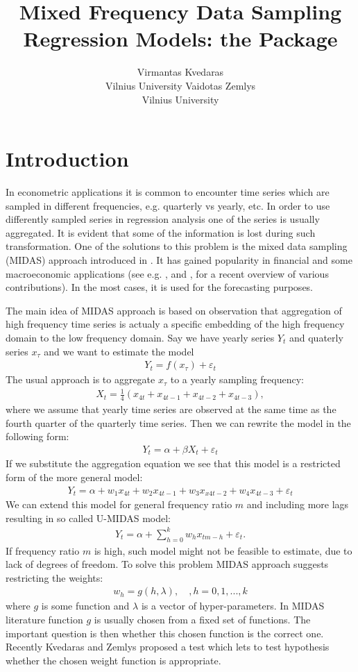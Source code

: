 \documentclass[nojss]{jss}
\author{Virmantas Kvedaras\\Vilnius University \And Vaidotas
  Zemlys\\Vilnius University}
\title{Mixed Frequency Data Sampling Regression Models: the \proglang{R}
    Package \pkg{midasr}}
\begin{document}
\section{Introduction}

In econometric applications it is common to encounter time series
which are sampled in different frequencies, e.g. quarterly vs yearly,
etc. In order to use differently sampled series in regression analysis
one of the series is usually aggregated. It is evident that some of
the information is lost during such transformation. One of the
solutions to this problem is the mixed data sampling (MIDAS) approach introduced in
\cite{ghysels_touch_2002}. It has gained popularity in financial and some
macroeconomic applications (see e.g. \citealp{foroni:2012}, and
\citealp{sinko:2012}, for a recent overview of various
contributions). In the most cases, it is used for the forecasting purposes.

The main idea of MIDAS approach is based on observation that
aggregation of high frequency time series is actualy a specific
embedding of the high frequency domain to the low frequency
domain. Say we have yearly series $Y_t$ and quaterly series
$x_{\tau}$ and we want to estimate the model
\begin{align*}
  Y_{t}=f(x_{\tau})+\varepsilon_t
\end{align*}
The usual approach is to aggregate $x_{\tau}$ to a yearly sampling frequency:
\begin{align*}
  X_{t}=\frac{1}{4}(x_{4t}+x_{4t-1}+x_{4t-2}+x_{4t-3}),
\end{align*}
where we assume that yearly time series are observed at the same time
as the fourth quarter of the quarterly time series. Then we can
rewrite the model in the following form:
\begin{align*}
  Y_t=\alpha+\beta X_t+\varepsilon_t
\end{align*}
If we substitute the aggregation equation we see that this model is a
restricted form of the more general model:
\begin{align*}
  Y_t=\alpha+w_1x_{4t}+w_2x_{4t-1}+w_3x_{x4t-2}+w_4x_{4t-3}+\varepsilon_t
\end{align*}
We can extend this model for general frequency ratio $m$ and including
more lags resulting in so called U-MIDAS model:
\begin{align*}
  Y_t=\alpha+\sum_{h=0}^kw_hx_{tm-h}+\varepsilon_t.
\end{align*}
If frequency ratio $m$ is high, such
model might not be feasible to estimate, due to lack of degrees of
freedom. To solve this problem MIDAS approach suggests restricting the weights:
\begin{align*}
  w_h=g(h,\lambda), \quad, h=0,1,...,k
\end{align*}
where $g$ is some function and $\lambda$ is a vector of
hyper-parameters. In MIDAS literature function $g$ is usually chosen from
a fixed set of functions. The important question is then whether this
chosen function is the correct one. Recently Kvedaras and Zemlys
\cite{kz:2012} proposed a test which lets to test hypothesis whether the chosen weight function is appropriate.
\end{document}
